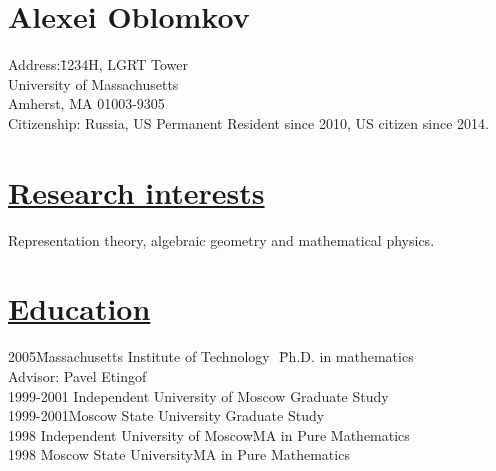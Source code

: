 \documentclass[11pt]{amsart}
\theoremstyle{plain}
\theoremstyle{definition}
\theoremstyle{remark}
\begin{document}
\section*{\bf{\huge Alexei Oblomkov}}
\bigskip



\begin{tabbing}
Address:\quad\quad\quad\;\= 1234H, LGRT Tower\\
                      \>University of Massachusetts\\
\>  Amherst, MA 01003-9305\\

Citizenship:\> Russia, US Permanent Resident since 2010, US citizen since 2014.
\end{tabbing}

\section*{\Large\underline{Research interests}}



\noindent Representation theory, algebraic geometry
and mathematical physics.




\section*{\Large\underline{Education}}
\begin{tabbing}
2005\quad\quad\quad\quad\quad\= Massachusetts Institute of
Technology   \quad\quad\,\,\:\:\:\:\= Ph.D. in
mathematics\\
\>\quad\quad  \>  Advisor: Pavel Etingof\\
1999-2001\> Independent University of
Moscow\> Graduate Study\\
1999-2001\>Moscow State University\> Graduate Study\\

1998\> Independent University of Moscow\>MA in Pure Mathematics\\
1998\> Moscow State University\>MA in Pure Mathematics
\end{tabbing}
\end{document}
